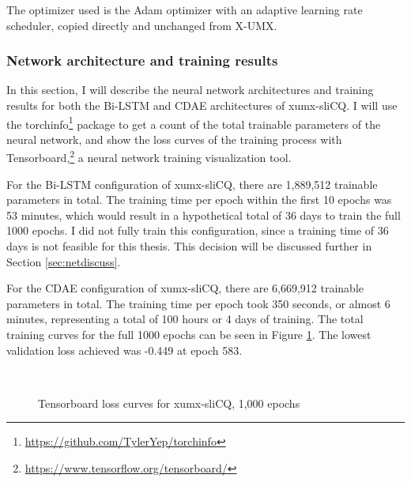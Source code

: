 \documentclass[report.tex]{subfiles}
\begin{document}
The optimizer used is the Adam optimizer with an adaptive learning rate scheduler, copied directly and unchanged from X-UMX.

\subsubsection{Network architecture and training results}
\label{sec:networktraining}

In this section, I will describe the neural network architectures and training results for both the Bi-LSTM and CDAE architectures of xumx-sliCQ. I will use the torchinfo\footnote{\url{https://github.com/TylerYep/torchinfo}} package to get a count of the total trainable parameters of the neural network, and show the loss curves of the training process with Tensorboard,\footnote{\url{https://www.tensorflow.org/tensorboard/}} a neural network training visualization tool.

For the Bi-LSTM configuration of xumx-sliCQ, there are 1,889,512 trainable parameters in total. The training time per epoch within the first 10 epochs was 53 minutes, which would result in a hypothetical total of 36 days to train the full 1000 epochs. I did not fully train this configuration, since a training time of 36 days is not feasible for this thesis. This decision will be discussed further in Section \ref{sec:netdiscuss}.

For the CDAE configuration of xumx-sliCQ, there are 6,669,912 trainable parameters in total. The training time per epoch took 350 seconds, or almost 6 minutes, representing a total of 100 hours or 4 days of training. The total training curves for the full 1000 epochs can be seen in Figure \ref{fig:networkloss}. The lowest validation loss achieved was -0.449 at epoch 583.

\begin{figure}[ht]
	\centering
	\\
	\caption{Tensorboard loss curves for xumx-sliCQ, 1,000 epochs}
	\label{fig:networkloss}
\end{figure}
\end{document}
